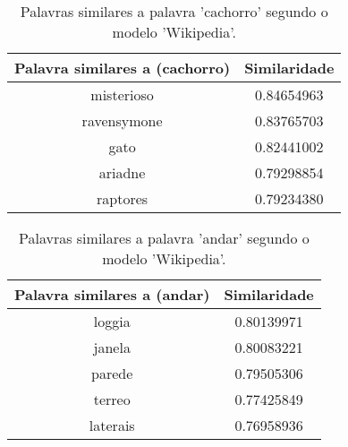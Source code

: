 \begin{table}[H]
\centering
\begin{tabular}{|c | c|}
 \hline
 Palavra similares a (cachorro) & Similaridade \\ [0.5ex]
 \hline
 misterioso & 0.84654963 \\
 \hline
 ravensymone & 0.83765703 \\
 \hline
 gato & 0.82441002 \\
 \hline
 ariadne & 0.79298854 \\
 \hline
 raptores & 0.79234380 \\
 \hline
\end{tabular}
\caption{Palavras similares a palavra 'cachorro' segundo o modelo 'Wikipedia'.}
\label{table:1}
\end{table}

\begin{table}[H]
\centering
\begin{tabular}{|c | c|}
 \hline
 Palavra similares a (andar) & Similaridade \\ [0.5ex]
 \hline
 loggia & 0.80139971 \\
 \hline
 janela & 0.80083221 \\
 \hline
 parede & 0.79505306 \\
 \hline
 terreo & 0.77425849 \\
 \hline
 laterais & 0.76958936 \\
 \hline
\end{tabular}
\caption{Palavras similares a palavra 'andar' segundo o modelo 'Wikipedia'.}
\label{table:1}
\end{table}

